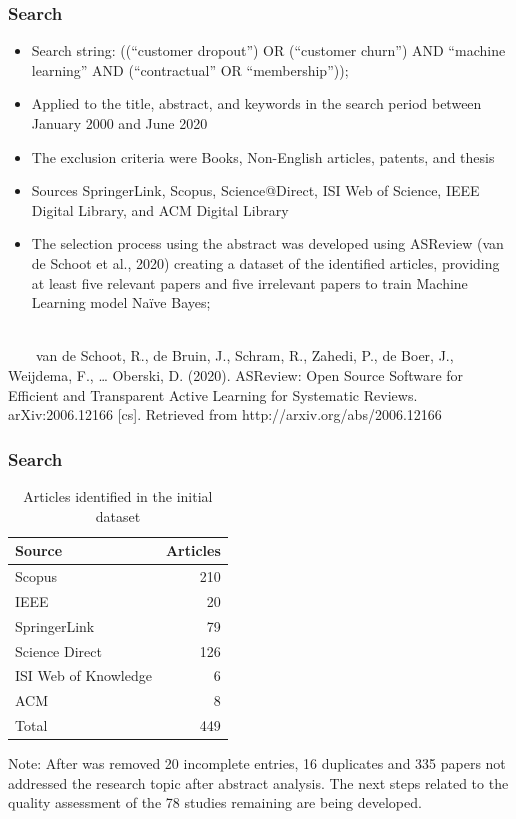 \documentclass[10pt]{beamer}
\begin{document}
\begin{frame}
	\frametitle{Search }
	\begin{itemize}
		\item Search string: ((“customer dropout”) OR (“customer churn”) AND “machine learning” AND (“contractual” OR “membership”));
		\item Applied to the title, abstract, and keywords in the search period between January 2000 and June 2020
		\item The exclusion criteria were Books, Non-English articles, patents, and thesis
		\item Sources SpringerLink, Scopus, Science@Direct, ISI Web of Science, IEEE Digital Library, and ACM Digital Library
		\item The selection process using the abstract was developed using ASReview (van de Schoot et al., 2020) creating a dataset of the identified articles, providing at least five relevant papers and five irrelevant papers to train Machine Learning model Naïve Bayes;
		\\~\\
	\end{itemize}
		\tiny 
		~~~~van de Schoot, R., de Bruin, J., Schram, R., Zahedi, P., de Boer, J., Weijdema, F., … Oberski, D. (2020). ASReview: Open Source Software for Efficient and Transparent Active Learning for Systematic Reviews. arXiv:2006.12166 [cs]. Retrieved from http://arxiv.org/abs/2006.12166 \\
\end{frame}

\begin{frame}
	\frametitle{Search }
	\begin{center}
		\begin{table}
		  \centering
		  \scriptsize
		  \caption{Articles identified in the initial dataset}
		    \begin{tabular}{ | p{4cm} | r |}
			    \toprule
			    Source & Articles\\
			    \midrule
				Scopus & 210 \\ 
				IEEE &  20	\\ 
				SpringerLink & 79 \\ 
				Science Direct & 126 \\ 
				ISI Web of Knowledge & 6\\ 
				ACM & 8 \\ \hline
				Total & 449 \\
				\bottomrule
			\end{tabular}
			\label{Sources}
		\begin{flushleft}
			Note: After was removed 20 incomplete entries, 16 duplicates and 335 papers not addressed the research topic after abstract analysis. 
			The next steps related to the quality assessment of the 78 studies remaining are being developed.
		\end{flushleft}
		\end{table}
	\end{center}
\end{frame}
\end{document}
